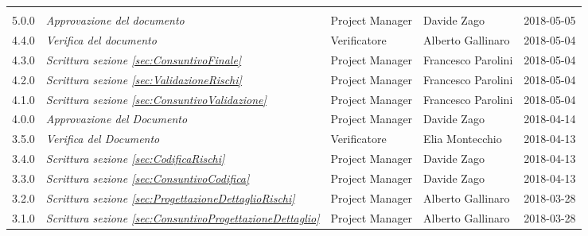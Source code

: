 \newpage 
\section*{}
	\begin{longtable}[H]{C{2cm}|C{4cm}|C{3cm}|C{3cm}|R{2cm}}
		
		 & & & &  \\
		
		
		5.0.0 &\emph{Approvazione del documento} & Project Manager & Davide Zago & 2018-05-05 \\
		\hline
		
		4.4.0 &\emph{Verifica del documento} & Verificatore & Alberto Gallinaro & 2018-05-04 \\
		\hline
		
		4.3.0 &\emph{Scrittura sezione \ref{sec:ConsuntivoFinale}} & Project Manager & Francesco Parolini & 2018-05-04 \\
		\hline
		
		4.2.0 &\emph{Scrittura sezione \ref{sec:ValidazioneRischi}} & Project Manager & Francesco Parolini & 2018-05-04 \\
		\hline
			
		4.1.0 &\emph{Scrittura sezione \ref{sec:ConsuntivoValidazione}} & Project Manager & Francesco Parolini & 2018-05-04 \\
		\hline
		
		4.0.0 &\emph{Approvazione del Documento} & Project Manager & Davide Zago & 2018-04-14 \\
		\hline
		
		3.5.0 &\emph{Verifica del Documento} & Verificatore & Elia Montecchio & 2018-04-13 \\
		\hline
		
		3.4.0 &\emph{Scrittura sezione \ref{sec:CodificaRischi}} & Project Manager &  Davide Zago & 2018-04-13 \\
		\hline
		
		3.3.0 &\emph{Scrittura sezione \ref{sec:ConsuntivoCodifica}} & Project Manager &  Davide Zago & 2018-04-13 \\
		\hline

		3.2.0 &\emph{Scrittura sezione \ref{sec:ProgettazioneDettaglioRischi}} & Project Manager & Alberto Gallinaro & 2018-03-28 \\
		\hline	
		
		3.1.0 &\emph{Scrittura sezione \ref{sec:ConsuntivoProgettazioneDettaglio}} & Project Manager & Alberto Gallinaro & 2018-03-28 \\
		\hline
		

\end{longtable}
